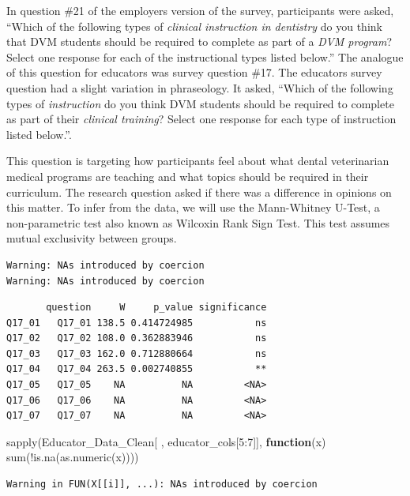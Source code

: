 \documentclass[
  11pt,
  letterpaper,
  DIV=11,
  numbers=noendperiod]{scrartcl}
\newenvironment{Shaded}{\begin{snugshade}}{\end{snugshade}}
\newcommand{\ControlFlowTok}[1]{\textcolor[rgb]{0.00,0.23,0.31}{\textbf{#1}}}
\newcommand{\DecValTok}[1]{\textcolor[rgb]{0.68,0.00,0.00}{#1}}
\newcommand{\FunctionTok}[1]{\textcolor[rgb]{0.28,0.35,0.67}{#1}}
\newcommand{\NormalTok}[1]{\textcolor[rgb]{0.00,0.23,0.31}{#1}}
\newcommand{\SpecialCharTok}[1]{\textcolor[rgb]{0.37,0.37,0.37}{#1}}
\begin{document}
In question \#21 of the employers version of the survey, participants
were asked, ``Which of the following types of \emph{clinical instruction
in dentistry} do you think that DVM students should be required to
complete as part of a \emph{DVM program}? Select one response for each
of the instructional types listed below.'' The analogue of this question
for educators was survey question \#17. The educators survey question
had a slight variation in phraseology. It asked, ``Which of the
following types of \emph{instruction} do you think DVM students should
be required to complete as part of their \emph{clinical training}?
Select one response for each type of instruction listed below.''.

This question is targeting how participants feel about what dental
veterinarian medical programs are teaching and what topics should be
required in their curriculum. The research question asked if there was a
difference in opinions on this matter. To infer from the data, we will
use the Mann-Whitney U-Test, a non-parametric test also known as
Wilcoxin Rank Sign Test. This test assumes mutual exclusivity between
groups.

\begin{verbatim}
Warning: NAs introduced by coercion
Warning: NAs introduced by coercion
\end{verbatim}

\begin{verbatim}
       question     W     p_value significance
Q17_01   Q17_01 138.5 0.414724985           ns
Q17_02   Q17_02 108.0 0.362883946           ns
Q17_03   Q17_03 162.0 0.712880664           ns
Q17_04   Q17_04 263.5 0.002740855           **
Q17_05   Q17_05    NA          NA         <NA>
Q17_06   Q17_06    NA          NA         <NA>
Q17_07   Q17_07    NA          NA         <NA>
\end{verbatim}

\begin{Shaded}
\begin{Highlighting}[]
\FunctionTok{sapply}\NormalTok{(Educator\_Data\_Clean[ , educator\_cols[}\DecValTok{5}\SpecialCharTok{:}\DecValTok{7}\NormalTok{]], }\ControlFlowTok{function}\NormalTok{(x) }\FunctionTok{sum}\NormalTok{(}\SpecialCharTok{!}\FunctionTok{is.na}\NormalTok{(}\FunctionTok{as.numeric}\NormalTok{(x))))}
\end{Highlighting}
\end{Shaded}

\begin{verbatim}
Warning in FUN(X[[i]], ...): NAs introduced by coercion
\end{verbatim}
\end{document}
